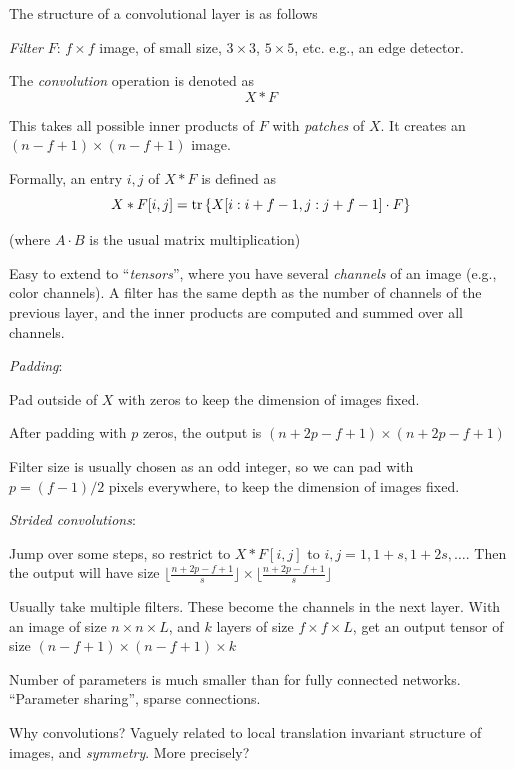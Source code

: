 \documentclass[english]{article}
\begin{document}
The structure of a convolutional layer is as follows

\benum 
\item 
\emph{Filter} $F$: $ f\times f$ image, of small size, $3 \times 3$, $5 \times 5$, etc. e.g., an edge detector.

The \emph{convolution} operation is denoted as 
$$X * F$$

This takes all possible inner products of $F$ with \emph{patches} of $X$. It creates an $(n-f+1) \times (n-f+1)$ image.

Formally, an entry $i,j$ of $X * F$ is defined as $$X * F[i,j]=\operatorname{tr} \left\{X[i:i+f-1,j:j+f-1] \cdot F \right\}$$ 

(where $A\cdot B$ is the usual matrix multiplication)

Easy to extend to ``\emph{tensors}'', where you have several \emph{channels} of an image (e.g., color channels). A filter has the same depth as the number of channels of the previous layer, and the inner products are computed and summed over all channels.

\item \emph{Padding}: 

Pad outside of $X$ with zeros to keep the dimension of images fixed. 

After padding with $p$ zeros, the output is $(n+2p-f+1) \times (n+2p-f+1)$

Filter size is usually chosen as an odd integer, so we can pad with $p = (f-1)/2$ pixels everywhere, to keep the dimension of images fixed. 

\item \emph{Strided convolutions}:

Jump over some steps, so restrict to $X * F[i,j]$ to $i,j=1,1+s,1+2s,\ldots$.
Then the output will have size $\lfloor \frac{n+2p-f+1}{s}\rfloor \times \lfloor \frac{n+2p-f+1}{s}\rfloor$

\item Usually take multiple filters. These become the channels in the next layer. With an image of size $n \times n \times L$, and $k$ layers of size 
$f \times f \times L$, get  an output tensor of size $(n-f+1) \times (n-f+1) \times k$ 


Number of parameters is much smaller than for fully connected networks. ``Parameter sharing'', sparse connections. %

Why convolutions? Vaguely related to local translation invariant structure of images, and \emph{symmetry}. %
More precisely?
\end{document}
